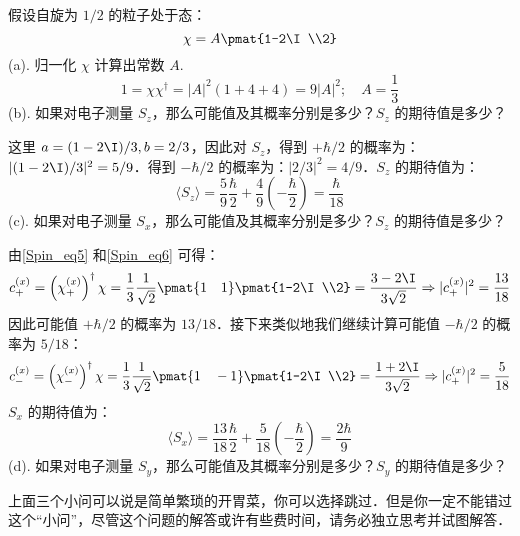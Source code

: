 \begin{example}{}
假设自旋为 $1/2$ 的粒子处于态：
\begin{equation}
\chi = A\pmat{1-2\I\\2}
\end{equation}
(a). 归一化 $\chi$ 计算出常数 $A$.
\begin{equation}
1=\chi\chi^\dagger=|A|^2(1+4+4)=9|A|^2;\quad A=\frac{1}{3}
\end{equation}
(b). 如果对电子测量 $S_z$，那么可能值及其概率分别是多少？$S_z$ 的期待值是多少？

这里 $a=(1-2\I)/3,b=2/3$，因此对 $S_z$，得到 $+\hbar/2$ 的概率为：$|(1-2\I)/3|^2=5/9$．得到 $-\hbar/2$ 的概率为：$|2/3|^2=4/9$．$S_z$ 的期待值为：
\begin{equation}
\langle S_z \rangle =\frac{5}{9}\frac{\hbar}{2}+\frac{4}{9}\left(-\frac{\hbar}{2}\right)=\frac{\hbar}{18}
\end{equation}
(c). 如果对电子测量 $S_x$，那么可能值及其概率分别是多少？$S_z$ 的期待值是多少？

由\autoref{Spin_eq5} 和\autoref{Spin_eq6} 可得：
\begin{equation}
c_+^{(x)}=\left(\chi_+^{(x)}\right)^\dagger\chi=\frac{1}{3}\frac{1}{\sqrt{2}}\pmat{1\quad 1}\pmat{1-2\I\\2}=\frac{3-2\I}{3\sqrt{2}}\Rightarrow |c_+^{(x)}|^2=\frac{13}{18}
\end{equation}
因此可能值 $+\hbar/2$ 的概率为 $13/18$．接下来类似地我们继续计算可能值 $-\hbar/2$ 的概率为 $5/18$：
\begin{equation}
c_-^{(x)}=\left(\chi_-^{(x)}\right)^\dagger\chi=\frac{1}{3}\frac{1}{\sqrt{2}}\pmat{1\quad -1}\pmat{1-2\I\\2}=\frac{1+2\I}{3\sqrt{2}}\Rightarrow |c_+^{(x)}|^2=\frac{5}{18}
\end{equation}
$S_x$ 的期待值为：
\begin{equation}
\langle S_x \rangle =\frac{13}{18}\frac{\hbar}{2}+\frac{5}{18}\left(-\frac{\hbar}{2}\right)=\frac{2\hbar}{9}
\end{equation}
(d). 如果对电子测量 $S_y$，那么可能值及其概率分别是多少？$S_y$ 的期待值是多少？

上面三个小问可以说是简单繁琐的开胃菜，你可以选择跳过．但是你一定不能错过这个“小问”，尽管这个问题的解答或许有些费时间，请务必独立思考并试图解答．


\end{example}
